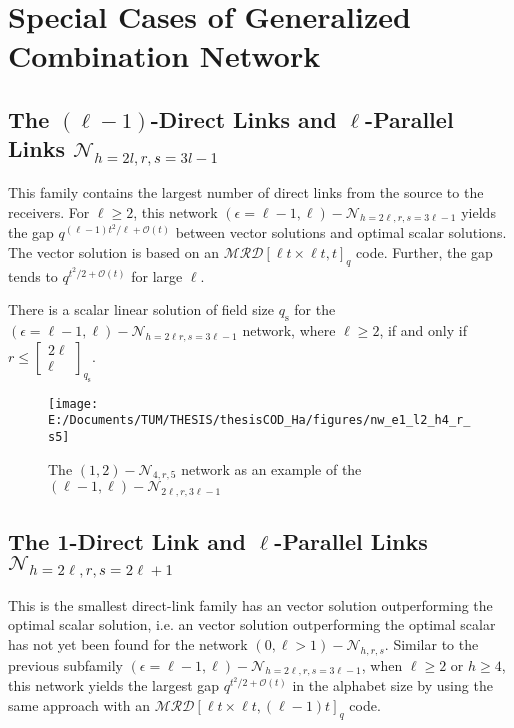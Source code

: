 \section{Special Cases of Generalized Combination Network}

\subsection{The $(\ell-1)$-Direct Links and $\ell$-Parallel Links $\mathcal{N}_{h=2l,r,s=3l-1}$}

This family contains the largest number of direct links from the source
to the receivers. For $\ell\geq2$, this network $\left(\epsilon=\ell-1,\ell\right)-\mathcal{N}_{h=2\ell,r,s=3\ell-1}$
yields the gap $q^{(\ell-1)t^{2}/\ell+\mathcal{O}(t)}$ between vector
solutions and optimal scalar solutions. The vector solution is based
on an $\mathcal{MRD}\left[\ell t\times\ell t,t\right]_{q}$ code.
Further, the gap tends to $q^{t^{2}/2+\mathcal{O}(t)}$ for large
$\ell$.
\begin{lem}
 There is a scalar linear solution of field size $q_{\mathrm{s}}$
for the $\left(\epsilon=\ell-1,\ell\right)-\mathcal{N}_{h=2\ell r,s=3\ell-1}$
network, where $\ell\geq2$, if and only if $r\leq\left[\begin{array}{c}
2\ell\\
\ell
\end{array}\right]_{q_{\mathrm{s}}}$.
\end{lem}
\begin{figure}[H]
\caption{The $\left(1,2\right)-\mathcal{N}_{4,r,5}$ network as an example
of the $\left(\ell-1,\ell\right)-\mathcal{N}_{2\ell,r,3\ell-1}$ \label{fig:network_l1e2h4rs5}}

\centering{}\texttt{[image: E:/Documents/TUM/THESIS/thesisCOD\_Ha/figures/nw\_e1\_l2\_h4\_r\_s5]}
\end{figure}


\subsection{The 1-Direct Link and $\ell$-Parallel Links $\mathcal{N}_{h=2\ell,r,s=2\ell+1}$}

This is the smallest direct-link family has an vector solution outperforming
the optimal scalar solution, i.e. an vector solution outperforming
the optimal scalar has not yet been found for the network $(0,\ell>1)-\mathcal{N}_{h,r,s}$.
Similar to the previous subfamily $\left(\epsilon=\ell-1,\ell\right)-\mathcal{N}_{h=2\ell,r,s=3\ell-1}$,
when $\ell\geq2$ or $h\geq4$, this network yields the largest gap
$q^{t^{2}/2+\mathcal{O}(t)}$ in the alphabet size by using the same
approach with an $\mathcal{MRD}\left[\ell t\times\ell t,(\ell-1)t\right]_{q}$
code. 

